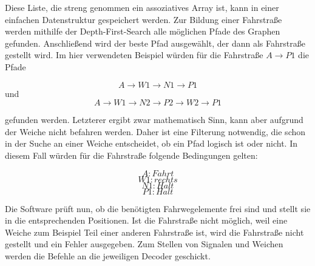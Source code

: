 Diese Liste, die streng genommen ein assoziatives Array ist, kann in einer einfachen Datenstruktur gespeichert werden. Zur Bildung einer Fahrstraße werden mithilfe der Depth-First-Search alle möglichen Pfade des Graphen gefunden. Anschließend wird der beste Pfad ausgewählt, der dann als Fahrstraße gestellt wird. Im hier verwendeten Beispiel würden für die Fahrstraße \(A \rightarrow P1\) die Pfade

\[A \rightarrow W1 \rightarrow N1 \rightarrow P1\] und
\[A \rightarrow W1 \rightarrow N2 \rightarrow P2 \rightarrow W2 \rightarrow P1\]

gefunden werden. Letzterer ergibt zwar mathematisch Sinn, kann aber aufgrund der Weiche nicht befahren werden. Daher ist eine Filterung notwendig, die schon in der Suche an einer Weiche entscheidet, ob ein Pfad logisch ist oder nicht. In diesem Fall würden für die Fahrstraße folgende Bedingungen gelten:

\[A: Fahrt\]
\[W1: rechts\]
\[N1: Halt\]
\[P1: Halt\]

Die Software prüft nun, ob die benötigten Fahrwegelemente frei sind und stellt sie in die entsprechenden Positionen. Ist die Fahrstraße nicht möglich, weil eine Weiche zum Beispiel Teil einer anderen Fahrstraße ist, wird die Fahrstraße nicht gestellt und ein Fehler ausgegeben. Zum Stellen von Signalen und Weichen werden die Befehle an die jeweiligen Decoder geschickt.
